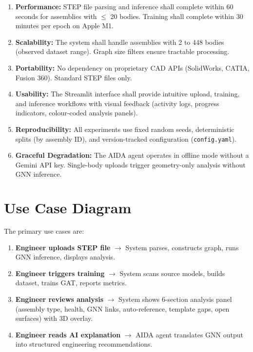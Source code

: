\documentclass[12pt]{report}
\begin{document}
\begin{enumerate}[label=NFR\arabic*.]
    \item \textbf{Performance:} STEP file parsing and inference shall complete within 60 seconds for assemblies with $\leq$ 20 bodies. Training shall complete within 30 minutes per epoch on Apple M1.
    \item \textbf{Scalability:} The system shall handle assemblies with 2 to 448 bodies (observed dataset range). Graph size filters ensure tractable processing.
    \item \textbf{Portability:} No dependency on proprietary CAD APIs (SolidWorks, CATIA, Fusion 360). Standard STEP files only.
    \item \textbf{Usability:} The Streamlit interface shall provide intuitive upload, training, and inference workflows with visual feedback (activity logs, progress indicators, colour-coded analysis panels).
    \item \textbf{Reproducibility:} All experiments use fixed random seeds, deterministic splits (by assembly ID), and version-tracked configuration (\texttt{config.yaml}).
    \item \textbf{Graceful Degradation:} The AIDA agent operates in offline mode without a Gemini API key. Single-body uploads trigger geometry-only analysis without GNN inference.
\end{enumerate}

\section{Use Case Diagram}

The primary use cases are:

\begin{enumerate}
    \item \textbf{Engineer uploads STEP file} $\rightarrow$ System parses, constructs graph, runs GNN inference, displays analysis.
    \item \textbf{Engineer triggers training} $\rightarrow$ System scans source models, builds dataset, trains GAT, reports metrics.
    \item \textbf{Engineer reviews analysis} $\rightarrow$ System shows 6-section analysis panel (assembly type, health, GNN links, auto-reference, template gaps, open surfaces) with 3D overlay.
    \item \textbf{Engineer reads AI explanation} $\rightarrow$ AIDA agent translates GNN output into structured engineering recommendations.
\end{enumerate}
\end{document}
